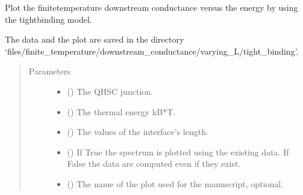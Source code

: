 \documentclass[letterpaper,10pt,english]{sphinxmanual}
\begin{document}
\begin{fulllineitems}
\label{\detokenize{modules:modules.utils.plot_finite_T_conductance_TB_vs_L}}
\pysigstartsignatures
{}
\pysigstopsignatures
\sphinxAtStartPar
Plot the finite\sphinxhyphen{}temperature downstream conductance versus the energy by using the tight\sphinxhyphen{}binding model.

\sphinxAtStartPar
The data and the plot are saved in the directory
‘files/finite\_temperature/downstream\_conductance/varying\_L/tight\_binding’.
\begin{quote}\begin{description}
\item[{Parameters}] \leavevmode\begin{itemize}
\item {} 
\sphinxAtStartPar
{} () \textendash{} The QH\sphinxhyphen{}SC junction.

\item {} 
\sphinxAtStartPar
{} () \textendash{} The thermal energy kB*T.

\item {} 
\sphinxAtStartPar
{} () \textendash{} The values of the interface’s length.

\item {} 
\sphinxAtStartPar
{} () \textendash{} If True the spectrum is plotted using the existing data.
If False the data are computed even if they exist.

\item {} 
\sphinxAtStartPar
{} () \textendash{} The name of the plot used for the manuscript, optional.

\end{itemize}

\end{description}\end{quote}

\end{fulllineitems}
\end{document}
